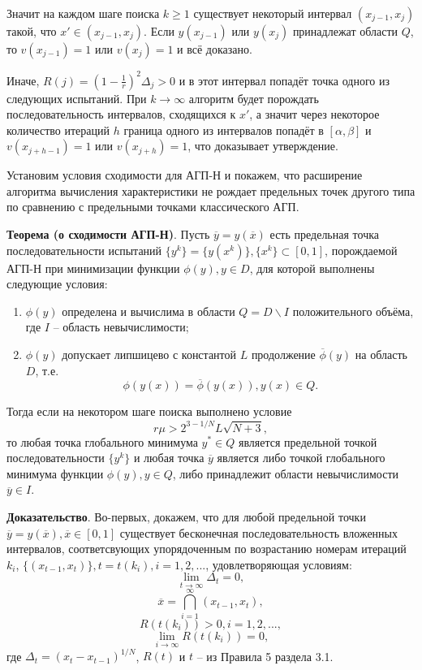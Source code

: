 \documentclass[10pt,a4paper]{book}
\begin{document}
Значит на каждом шаге поиска $k \geq 1$ существует некоторый интервал $(x_{j-1}, x_{j})$ такой, что $x' \in (x_{j-1}, x_{j})$. Если $y(x_{j-1})$ или $y(x_{j})$ принадлежат области $Q$, то $v(x_{j-1}) = 1$ или $v(x_j) = 1$ и всё доказано.

Иначе, $R(j)=(1-\frac{1}{r})^2\Delta_j>0$ и в этот интервал попадёт точка одного из следующих испытаний. При $k \to \infty$ алгоритм будет порождать последовательность интервалов, сходящихся к $x'$, а значит через некоторое количество итераций $h$ граница одного из интервалов попадёт в $[\alpha, \beta]$ и $v(x_{j+h-1}) = 1$ или $v(x_{j+h}) = 1$, что доказывает утверждение.

Установим условия сходимости для АГП-Н и покажем, что расширение алгоритма вычисления характеристики не рождает предельных точек другого типа по сравнению с предельными точками классического АГП.

\textbf{Теорема (о сходимости АГП-Н)}. Пусть $\overline{y}=y(\overline{x})$ есть предельная точка последовательности испытаний $\{y^k\}=\{y(x^k)\}, \{x^k\} \subset [0,1]$, порождаемой АГП-Н при минимизации функции $\phi(y), y \in D$, для которой выполнены следующие условия:
\begin{enumerate}
\item{$\phi(y)$ определена и вычислима в области $Q = D \backslash I$ положительного объёма, где $I$ -- область невычислимости;}
\item{$\phi(y)$ допускает липшицево с константой $L$ продолжение $\overline{\phi}(y)$ на область $D$, т.е.
\[
\phi(y(x))=\overline{\phi}(y(x)), y(x) \in Q.
\]
}
\end{enumerate}
Тогда если на некотором шаге поиска выполнено условие
\[
r\mu > 2^{3-1/N}L\sqrt{N+3},
\]
то любая точка глобального минимума $y^* \in Q$ является предельной точкой последовательности $\{y^k\}$ и любая точка $\overline{y}$ является либо точкой глобального минимума функции $\phi(y), y \in Q$, либо принадлежит области невычислимости $\overline{y} \in I$.

\textbf{Доказательство}. Во-первых, докажем, что для любой предельной точки $\overline{y}=y(\overline{x}), \overline{x} \in [0,1]$ существует бесконечная последовательность вложенных интервалов, соответсвующих упорядоченным по возрастанию номерам итераций $k_i$, $\{(x_{t-1}, x_t)\}, t = t(k_i), i = 1, 2, ...$, удовлетворяющая условиям:
\[
\lim_{t \to \infty}{\Delta_t} = 0,
\]
\[
\overline{x}=\bigcap_{i = 1}^{\infty}{(x_{t-1}, x_t)},
\]
\[
R(t(k_i))>0, i = 1, 2, ... ,
\]
\[
\lim_{i \to \infty}{R(t(k_i))} = 0,
\]
где $\Delta_t = (x_t - x_{t-1})^{1/N}$, $R(t)$ и $t$ -- из Правила 5 раздела 3.1.
\end{document}
